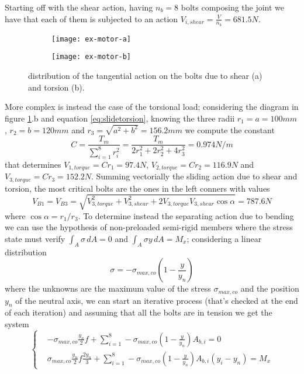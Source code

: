 \begin{enumerate}[a)]
		Starting off with the shear action, having $n_b = 8$ bolts composing the joint we have that each of them is subjected to an action $V_{i, shear} = \frac V {n_b} = 681.5N$.  		
		\begin{figure}[t]
			\centering
			\begin{subfigure}{0.48\linewidth}
				\centering \texttt{[image: ex-motor-a]} \caption{}
			\end{subfigure}
			\begin{subfigure}{0.48\linewidth}
				\centering \texttt{[image: ex-motor-b]} \caption{}
			\end{subfigure}
			\caption{distribution of the tangential action on the bolts due to shear (a) and torsion (b).} \label{fig:ex-motor-torsion}
		\end{figure}
		More complex is instead the case of the torsional load; considering the diagram in figure \ref{fig:ex-motor-torsion}.b and equation \ref{eq:slidetorsion}, knowing the three radii $r_1 = a = 100mm$, $r_2 = b = 120mm$ and $r_3 = \sqrt{a^2+b^2} = 156.2mm$ we compute the constant
		\[ C = \frac{T_m}{\sum_{i=1}^8 r_i^2} = \frac{T_m}{2r_1^2 + 2r_2^2 + 4r_3^2} = 0.974N / m \]
		that determines $V_{1,torque} = C r_1 = 97.4N$, $V_{2,torque} = C r_2 = 116.9N$ and $V_{3,torque} = C r_3 = 152.2N$. Summing vectorially the sliding action due to shear and torsion, the most critical bolts are the ones in the left conners with values
		\[ V_{B1} = V_{B3} = \sqrt{V_{3,torque}^2 + V_{3,shear}^2 + 2V_{3,torque} V_{3,shear} \cos \alpha } = 787.6N \] 	 
		where $\cos\alpha = r_1/r_3$.	To determine instead the separating action due to bending we can use the hypothesis of non-preloaded semi-rigid members where the stress state must verify $\int_A \sigma\, dA = 0$ and $\int_A\sigma y\, dA=M_x$; considering a linear distribution
		\[ \sigma = - \sigma_{max,co} \left( 1 - \frac y {y_n} \right) \]
		where the unknowns are the maximum value of the stress $\sigma_{max,co}$ and the position $y_n$ of the neutral axis, we can start an iterative process (that's checked at the end of each iteration) and assuming that all the bolts are in tension we get the system
		\[\left\{\begin{aligned}
			& - \sigma_{max,co} \frac {y_n}2 f + \sum_{i=1}^8 - \sigma_{max,co} \left( 1 - \frac{y}{y_n} \right)A_{b,i} = 0 \\
			& \sigma_{max,co} \frac{y_n}{2} f \frac{2y_n}{3} + \sum_{i=1}^8 - \sigma_{max,co} \left(1 - \frac y {y_n}\right) A_{b,i}(y_i-y_n) = M_x
		\end{aligned} \right.\]

\end{enumerate}
